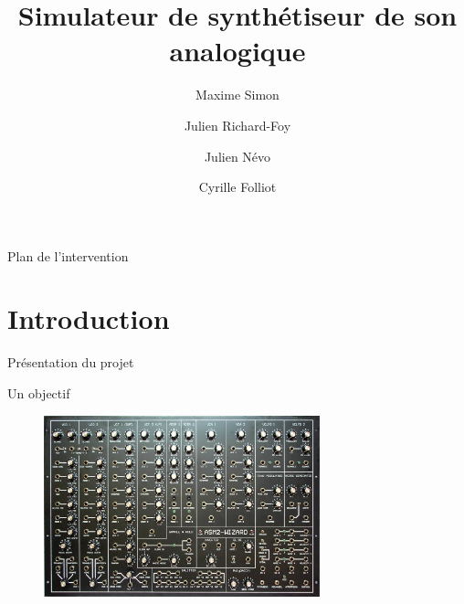 \documentclass[frenchb]{beamer}
\title[M2GL-VET]{Simulateur de synthétiseur de son analogique}
\author{Maxime Simon\and Julien Richard-Foy\and Julien Névo \and Cyrille Folliot}
\institute[ISTIC]{Université de Rennes 1}
\begin{document}
\begin{frame}
    \titlepage
\end{frame}
	
	
\begin{frame}{Plan de l'intervention}
    \tableofcontents
\end{frame}


\section{Introduction}


\begin{frame}{Présentation du projet}
\end{frame}

\begin{frame}{Un objectif}
    \begin{figure}
        \includegraphics[width=8cm ]{../img/png/synth.jpg}
    \end{figure}
\end{frame}
\end{document}

